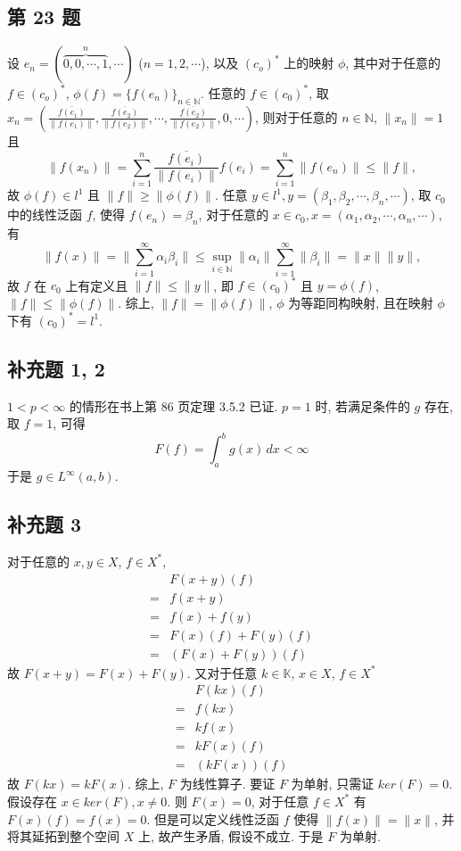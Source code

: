 \documentclass[\ROOT/main.tex]{subfiles}
\begin{document}
\subsection{第 23 题}
设 $e_n = (\overbrace{0, 0, \cdots, 1}^{n}, \cdots)$ ($n = 1, 2, \cdots$),
以及 $(c_o)^*$ 上的映射 $\phi$,
其中对于任意的 $f \in \left( c_o \right)^*$, $\phi (f) = \{ f(e_n) \}_{n \in \mathbb{N}}$.
任意的 $f \in (c_0)^*$, 取
$x_n = (\frac{\overline{f(e_1)}}{\| f(e_1) \|}, \frac{\overline{f(e_2)}}{\| f(e_2) \|}, \cdots, \frac{\overline{f(e_2)}}{\| f(e_2) \|}, 0, \cdots)$,
则对于任意的 $n \in \mathbb{N}$, $\| x_n \| = 1$ 且
\[
    \| f(x_n) \| = \sum_{i = 1}^{n} \frac{\overline{f(e_i)}}{\| f(e_i) \|} f(e_i) = \sum_{i = 1}^{n} \| f(e_n) \| \leqslant \| f \|,
\]
故 $\phi (f) \in l^1$ 且 $\| f \| \geqslant \| \phi (f) \|$.
任意 $y \in l^1, y = (\beta_1, \beta_2, \cdots, \beta_n, \cdots)$,
取 $c_0$ 中的线性泛函 $f$, 使得 $f(e_n) = \beta_n$,
对于任意的 $x \in c_0, x = (\alpha_1, \alpha_2, \cdots, \alpha_n, \cdots)$, 有
\[
    \| f(x) \|
    = \| \sum_{i = 1}^{\infty} \alpha_i \beta_i \|
    \leqslant \sup_{i \in \mathbb{N}} \| \alpha_i \| \sum_{i = 1}^{\infty} \| \beta_i \|
    = \| x \| \| y \|,
\]
故 $f$ 在 $c_0$ 上有定义且 $\| f \| \leqslant \| y \|$,
即 $f \in (c_0)^*$ 且 $y = \phi (f)$, $\| f \| \leqslant \| \phi (f) \|$.
综上, $\| f \| = \| \phi (f) \|$, $\phi$ 为等距同构映射, 且在映射 $\phi$ 下有 $(c_0)^* = l^1$.

\subsection{补充题 1, 2}
$1 < p < \infty$ 的情形在书上第 86 页定理 3.5.2 已证.
$p = 1$ 时, 若满足条件的 $g$ 存在, 取 $f = 1$, 可得
\[
    F(f) = \int_{a}^{b} g(x) \, dx < \infty
\]
于是 $g \in L^{\infty} (a, b)$.

\subsection{补充题 3}
对于任意的 $x, y \in X$, $f \in X^*$,
\begin{align*}
     & F(x + y)(f) \\
    =& f(x + y) \\
    =& f(x) + f(y) \\
    =& F(x)(f) + F(y)(f) \\
    =& (F(x) + F(y))(f)
\end{align*}
故 $F(x + y) = F(x) + F(y)$.
又对于任意 $k \in \mathbb{K}$, $x \in X$, $f \in X^*$
\begin{align*}
     & F(k x)(f) \\
    =& f(k x) \\
    =& k f(x) \\
    =& k F(x)(f) \\
    =& (k F(x))(f)
\end{align*}
故 $F(k x) = k F(x)$.
综上, $F$ 为线性算子.
要证 $F$ 为单射, 只需证 $ker(F) = {0}$.
假设存在 $x \in ker(F), x \neq 0$.
则 $F(x) = 0$, 对于任意 $f \in X^*$ 有 $F(x)(f) = f(x) = 0$.
但是可以定义线性泛函 $f$ 使得 $\| f(x) \| = \| x \|$, 并将其延拓到整个空间 $X$ 上, 故产生矛盾, 假设不成立. 于是 $F$ 为单射.
\end{document}
